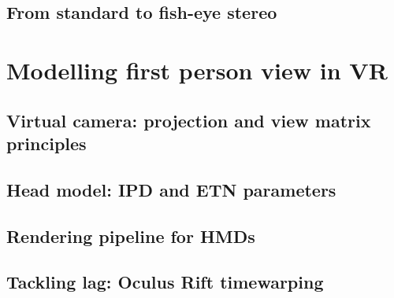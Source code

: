 \subsection{From standard to fish-eye stereo}


\section{Modelling first person view in VR}

\subsection{Virtual camera: projection and view matrix principles}

\subsection{Head model: IPD and ETN parameters}

\subsection{Rendering pipeline for HMDs}

\subsection{Tackling lag: Oculus Rift timewarping}










